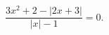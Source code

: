 \begin{ex}[type=equation]
	\begin{condition}
		$\dfrac{3x^2 + 2 - \big|2x  + 3\big|}{\big| x\big| - 1} = 0 .$
	\end{condition}
\end{ex}